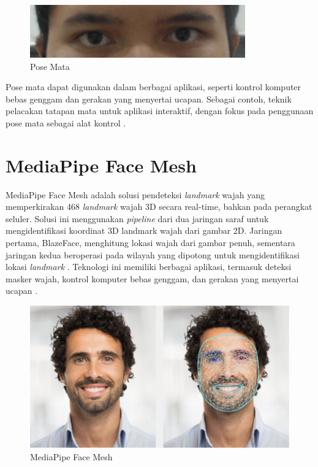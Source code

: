 \begin{figure} [ht] \centering
    \includegraphics[width=.6\textwidth]{gambar/bab3/gaze.png}
    \caption{Pose Mata}
    \label{fig:gaze}
\end{figure}

Pose mata dapat digunakan dalam berbagai aplikasi, seperti kontrol komputer bebas genggam  dan gerakan yang menyertai ucapan. Sebagai contoh, teknik pelacakan tatapan mata untuk aplikasi interaktif, dengan fokus pada penggunaan pose mata sebagai alat kontrol \parencite{Morimoto_Mimica_2005}. 

\section{MediaPipe Face Mesh}

MediaPipe Face Mesh adalah solusi pendeteksi \textit{landmark} wajah yang memperkirakan 468 \textit{landmark} wajah 3D secara real-time, bahkan pada perangkat seluler. Solusi ini menggunakan \textit{pipeline} dari dua jaringan saraf untuk mengidentifikasi koordinat 3D landmark wajah dari gambar 2D. Jaringan pertama, BlazeFace, menghitung lokasi wajah dari gambar penuh, sementara jaringan kedua beroperasi pada wilayah yang dipotong untuk mengidentifikasi lokasi \textit{landmark} \parencite{mediapipe_2020}. Teknologi ini memiliki berbagai aplikasi, termasuk deteksi masker wajah, kontrol komputer bebas genggam, dan gerakan yang menyertai ucapan \parencite{thaman_2022}.

\begin{figure} [ht] \centering
    \includegraphics[width=.55\textwidth]{gambar/face_landmark.png}
    \caption{MediaPipe Face Mesh}
    \label{fig:facemesh}
\end{figure}

